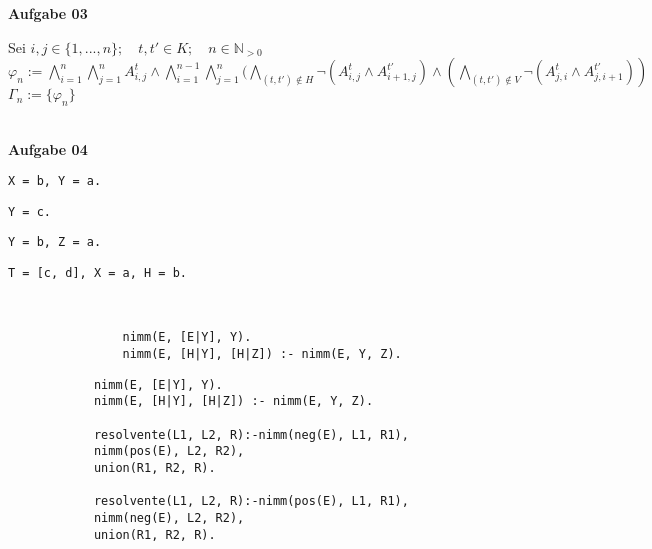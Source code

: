 \documentclass[a4paper,10pt]{article}
\begin{document}
	\textbf{Aufgabe 03}
	\begin{compactenum} [(a)]
		\item Sei $ i,j \in \{1,...,n\}; \quad t,t' \in K; \quad n \in \mathbb{N}_{>0} $\\
		$ \varphi_n := \bigwedge\limits_{i = 1}^n \bigwedge\limits_{j = 1}^n A_{i,j}^t \wedge \bigwedge\limits_{i=1}^{n-1} \bigwedge\limits_{j=1}^n (\bigwedge\limits_{(t,t') \not\in H} \lnot (A_{i,j}^t \wedge A_{i+1,j}^{t'}) \wedge (\bigwedge\limits_{(t,t') \not\in V} \lnot (A_{j,i}^t \wedge A_{j,i+1}^{t'})) $ \\
		$ \Gamma_n := \{\varphi_n\} $
		
		\item 
	\end{compactenum}\ \\

	\textbf{Aufgabe 04}
	\begin{compactenum} [(a)]
		\item \begin{compactenum} [(i)]
			\item \verb|X = b, Y = a.|
			\item \verb|Y = c.|
			\item \verb|Y = b, Z = a.|
			\item \verb|T = [c, d], X = a, H = b.|
		\end{compactenum}\
		\item 
		
		\newpage
		\item 
		\begin{verbatim}
				nimm(E, [E|Y], Y).
				nimm(E, [H|Y], [H|Z]) :- nimm(E, Y, Z).
		\end{verbatim}
		\item 
		\begin{verbatim}
			nimm(E, [E|Y], Y).
			nimm(E, [H|Y], [H|Z]) :- nimm(E, Y, Z).
			
			resolvente(L1, L2, R):-nimm(neg(E), L1, R1),
			nimm(pos(E), L2, R2),
			union(R1, R2, R).
			
			resolvente(L1, L2, R):-nimm(pos(E), L1, R1),
			nimm(neg(E), L2, R2),
			union(R1, R2, R).
		\end{verbatim}
		
		
		
		
		
		
		
		
		
		
		
		
	\end{compactenum}
\end{document}
